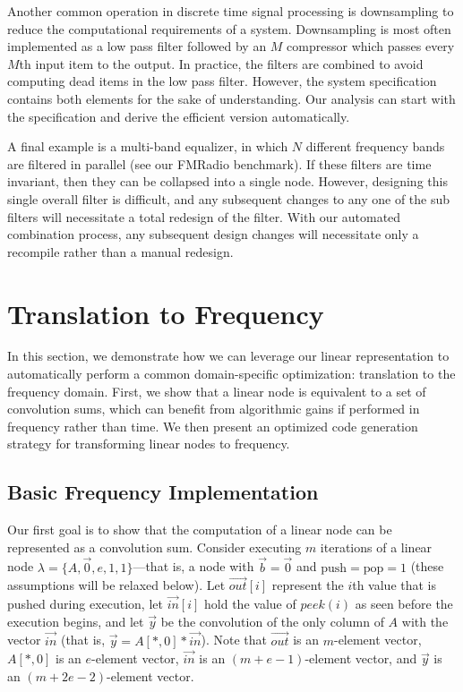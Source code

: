\documentclass{sig-alternate}
\begin{document}
{Another common operation in discrete time signal processing is
downsampling to reduce the computational requirements of a system.
Downsampling is most often implemented as a low pass filter followed
by an $M$ compressor which passes every $M$th input item to the
output.  In practice, the filters are combined to avoid computing dead
items in the low pass filter.  However, the system specification
contains both elements for the sake of understanding.  Our analysis can
start with the specification and derive the efficient version automatically.

A final example is a multi-band equalizer, in which $N$ different
frequency bands are filtered in parallel (see our FMRadio benchmark).
If these filters are time invariant, then they can be collapsed into a
single node.  However, designing this single overall filter is
difficult, and any subsequent changes to any one of the sub filters
will necessitate a total redesign of the filter.  With our automated
combination process, any subsequent design changes will necessitate
only a recompile rather than a manual redesign.

\vspace{-6pt}
\section{Translation to Frequency}
\label{sec:freq}

In this section, we demonstrate how we can leverage our linear
representation to automatically perform a common domain-specific
optimization: translation to the frequency domain.  First, we show
that a linear node is equivalent to a set of convolution sums, which
can benefit from algorithmic gains if performed in frequency rather
than time.  We then present an optimized code generation strategy for
transforming linear nodes to frequency.

\subsection{Basic Frequency Implementation}

Our first goal is to show that the computation of a linear node can be
represented as a convolution sum.  Consider executing $m$ iterations
of a linear node $\lambda = \{A, {\vec 0}, e, 1, 1\}$---that is, a
node with $\vec{b} = \vec{0}$ and $\mbox{push}=\mbox{pop}=1$ (these
assumptions will be relaxed below).  Let $\vec{out}[i]$ represent the
$i$th value that is pushed during execution, let $\vec{in}[i]$ hold
the value of $peek(i)$ as seen before the execution begins, and let
${\vec y}$ be the convolution of the only column of $A$ with the
vector $\vec{in}$ (that is, $\vec{y} = A[*,0] * {\vec{in}}$).
Note that $\vec{out}$ is an $m$-element vector, $A[*,0]$ is an
$e$-element vector, ${\vec{in}}$ is an $(m+e-1)$-element vector, and
${\vec y}$ is an $(m+2e-2)$-element vector.

}
\end{document}
